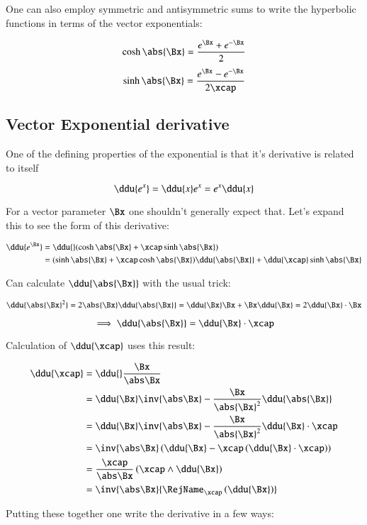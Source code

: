 One can also employ symmetric and antisymmetric sums to write the hyperbolic functions in terms of the
vector exponentials:

\[
\cosh\abs{\Bx} = \frac{e^\Bx + e^{-\Bx}}{2}
\]
\[
\sinh\abs{\Bx} = \frac{e^\Bx - e^{-\Bx}}{2\xcap}
\]

\subsection{Vector Exponential derivative }
One of the defining properties of the exponential is that it's derivative is related to itself

\[
\ddu{e^{x}} = \ddu{x}e^{x} = e^{x} \ddu{x}
\]

For a vector parameter $\Bx$ one shouldn't generally expect that.  Let's expand this to see the form of this
derivative:

\begin{align*}
\ddu{e^{\Bx}} 
&= \ddu{}( \cosh\abs{\Bx} + \xcap \sinh\abs{\Bx} ) \\
&= ( \sinh\abs{\Bx} + \xcap \cosh\abs{\Bx} ) \ddu{\abs{\Bx}} + \ddu{\xcap} \sinh\abs{\Bx} \\
\end{align*}

Can calculate $\ddu{\abs{\Bx}}$ with the usual trick:

\[
\ddu{\abs{\Bx}^2} = 2\abs{\Bx}\ddu{\abs{\Bx}} = \ddu{\Bx}\Bx + \Bx\ddu{\Bx} = 2 \ddu{\Bx} \cdot \Bx
\]

\[
\implies
\ddu{\abs{\Bx}} = \ddu{\Bx} \cdot \xcap
\]

Calculation of $\ddu{\xcap}$ uses this result:

\begin{align*}
\ddu{\xcap}
&= \ddu{}\frac{\Bx}{\abs\Bx}  \\
&= \ddu{\Bx}\inv{\abs\Bx} - \frac{\Bx}{\abs{\Bx}^2}\ddu{\abs{\Bx}} \\
&= \ddu{\Bx}\inv{\abs\Bx} - \frac{\Bx}{\abs{\Bx}^2} \ddu{\Bx} \cdot \xcap \\
&= \inv{\abs\Bx}\left( \ddu{\Bx} - \xcap \left(\ddu{\Bx} \cdot \xcap\right) \right) \\
&= \frac{\xcap}{\abs\Bx} \left(\xcap \wedge \ddu{\Bx} \right) \\
&= \inv{\abs\Bx} {\RejName_{\xcap}\left(\ddu{\Bx}\right)} \\
\end{align*}

Putting these together one write the derivative in a few ways:

